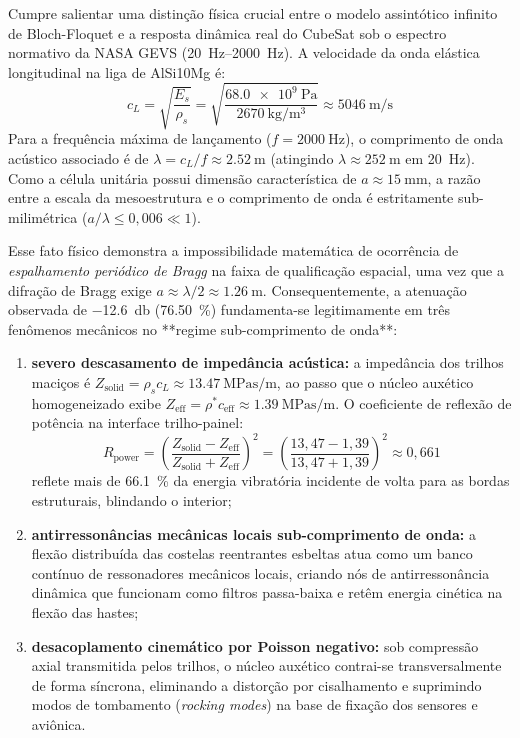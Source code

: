 Cumpre salientar uma distinção física crucial entre o modelo assintótico infinito de Bloch-Floquet e a resposta dinâmica real do CubeSat sob o espectro normativo da NASA GEVS (\SIrange{20}{2000}{\hertz}). A velocidade da onda elástica longitudinal na liga de AlSi10Mg é:
\begin{equation}
  c_L = \sqrt{\frac{E_s}{\rho_s}} = \sqrt{\frac{\SI{68.0e9}{\pascal}}{\SI{2670}{\kilo\gram\per\cubic\metre}}} \approx \SI{5046}{\metre\per\second}
\end{equation}
Para a frequência máxima de lançamento ($f = \SI{2000}{\hertz}$), o comprimento de onda acústico associado é de $\lambda = c_L / f \approx \SI{2.52}{\metre}$ (atingindo $\lambda \approx \SI{252}{\metre}$ em \SI{20}{\hertz}). Como a célula unitária possui dimensão característica de $a \approx \SI{15}{\milli\metre}$, a razão entre a escala da mesoestrutura e o comprimento de onda é estritamente sub-milimétrica ($a / \lambda \le 0{,}006 \ll 1$). 

Esse fato físico demonstra a impossibilidade matemática de ocorrência de \textit{espalhamento periódico de Bragg} na faixa de qualificação espacial, uma vez que a difração de Bragg exige $a \approx \lambda/2 \approx \SI{1.26}{\metre}$. Consequentemente, a atenuação observada de \SI{-12.6}{\decibel} (\SI{76.50}{\percent}) fundamenta-se legitimamente em três fenômenos mecânicos no **regime sub-comprimento de onda**:
\begin{enumerate}
  \item \textbf{severo descasamento de impedância acústica:} a impedância dos trilhos maciços é $Z_{\text{solid}} = \rho_s c_L \approx \SI{13.47}{\mega\pascal\second\per\metre}$, ao passo que o núcleo auxético homogeneizado exibe $Z_{\text{eff}} = \rho^* c_{\text{eff}} \approx \SI{1.39}{\mega\pascal\second\per\metre}$. O coeficiente de reflexão de potência na interface trilho-painel:
  \begin{equation}
    R_{\text{power}} = \left( \frac{Z_{\text{solid}} - Z_{\text{eff}}}{Z_{\text{solid}} + Z_{\text{eff}}} \right)^2 = \left( \frac{13{,}47 - 1{,}39}{13{,}47 + 1{,}39} \right)^2 \approx 0{,}661
  \end{equation}
  reflete mais de \SI{66.1}{\percent} da energia vibratória incidente de volta para as bordas estruturais, blindando o interior;
  \item \textbf{antirressonâncias mecânicas locais sub-comprimento de onda:} a flexão distribuída das costelas reentrantes esbeltas atua como um banco contínuo de ressonadores mecânicos locais, criando nós de antirressonância dinâmica que funcionam como filtros passa-baixa e retêm energia cinética na flexão das hastes;
  \item \textbf{desacoplamento cinemático por Poisson negativo:} sob compressão axial transmitida pelos trilhos, o núcleo auxético contrai-se transversalmente de forma síncrona, eliminando a distorção por cisalhamento e suprimindo modos de tombamento (\textit{rocking modes}) na base de fixação dos sensores e aviônica.
\end{enumerate}

